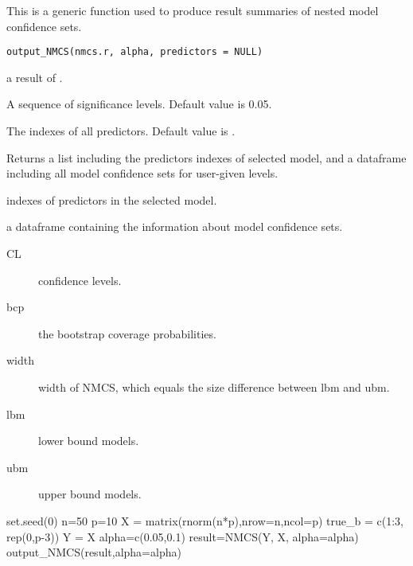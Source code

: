 \documentclass[a4paper]{book}
\begin{document}
%
\begin{Description}\relax
This is a generic function used to produce result summaries of nested model confidence sets.
\end{Description}
%
\begin{Usage}
\begin{verbatim}
output_NMCS(nmcs.r, alpha, predictors = NULL)
\end{verbatim}
\end{Usage}
%
\begin{Arguments}
\begin{ldescription}
\item[\code{nmcs.r}] a result of .

\item[\code{alpha}] A sequence of significance levels. Default value is 0.05.

\item[\code{predictors}] The indexes of all predictors. Default value is .
\end{ldescription}
\end{Arguments}
%
\begin{Value}
Returns a list including the predictors indexes of selected model, and a
dataframe including all model confidence sets for user-given  levels.
\begin{ldescription}
\item[\code{hat\_M}] indexes of predictors in the selected model.
\item[\code{MCS.frame}] a dataframe containing the information about model confidence sets.
\begin{description}

\item[CL] confidence levels.
\item[bcp] the bootstrap coverage probabilities.
\item[width] width of NMCS, which equals the size difference between lbm and ubm.
\item[lbm] lower bound models.
\item[ubm] upper bound models.

\end{description}


\end{ldescription}
\end{Value}
%
\begin{Examples}
\begin{ExampleCode}
set.seed(0)
n=50
p=10
X = matrix(rnorm(n*p),nrow=n,ncol=p)
true_b = c(1:3, rep(0,p-3))
Y = X %
alpha=c(0.05,0.1)
result=NMCS(Y, X, alpha=alpha)
output_NMCS(result,alpha=alpha)
\end{ExampleCode}
\end{Examples}
\printindex{}
\end{document}
